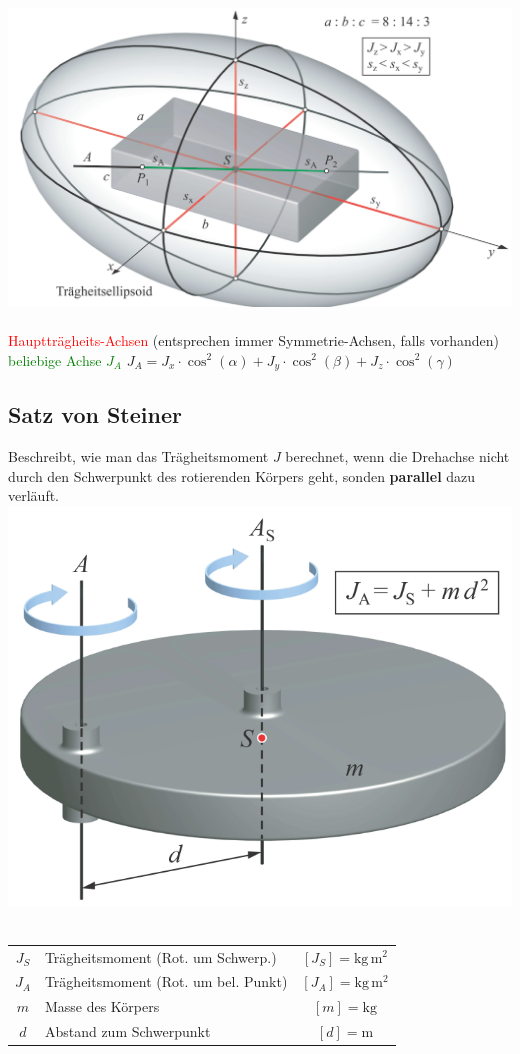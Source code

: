 	\includegraphics[width=0.8\linewidth]{Bilder/traegheits_ellipsoid} \\	
	\\
	\textcolor{red}{Hauptträgheits-Achsen} (entsprechen immer Symmetrie-Achsen, falls vorhanden) \\
	\textcolor{green}{beliebige Achse $J_A$} \quad $J_A = J_x \cdot \cos^2(\alpha) + J_y \cdot \cos^2(\beta) + J_z \cdot \cos^2(\gamma)$
	
	
	\subsection{Satz von Steiner}
	Beschreibt, wie man das Trägheitsmoment $J$ berechnet, wenn die Drehachse nicht durch den Schwerpunkt des rotierenden Körpers geht, sonden \textbf{parallel} dazu verläuft. \\
	
	\includegraphics[width=0.6\linewidth]{Bilder/steiner} \\	
	\\
	\begin{tabular}{c l c}
	$J_S$ & Trägheitsmoment (Rot. um Schwerp.)  & $[J_S] = \mathrm{kg \, m^2}$ \\
	$J_A$ & Trägheitsmoment (Rot. um bel. Punkt)  & $[J_A] = \mathrm{kg \, m^2}$ \\
	$m$ & Masse des Körpers & $[m] = \mathrm{kg}$ \\
	$d$ & Abstand zum Schwerpunkt & $[d] = \mathrm{m}$ \\
	\end{tabular}
	
